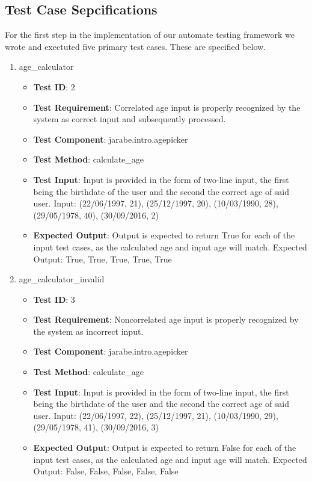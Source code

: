 \documentclass{article}
\begin{document}
\subsection{Test Case Sepcifications}
For the first step in the implementation of our automate testing framework we wrote and exectuted five primary test cases. These are specified below.
\begin{enumerate}[noitemsep]
\item age\_calculator
\begin{itemize}[noitemsep,topsep=0pt]
\item \textbf{Test ID}: 2
\item \textbf{Test Requirement}: Correlated age input is properly recognized by the system as correct input and subsequently processed.
\item \textbf{Test Component}: jarabe.intro.agepicker
\item \textbf{Test Method}: calculate\_age
\item \textbf{Test Input}: Input is provided in the form of two-line input, the first being the birthdate of the user and the second the correct age of said user. Input: (22/06/1997, 21), (25/12/1997, 20), (10/03/1990, 28), (29/05/1978, 40), (30/09/2016, 2)
\item \textbf{Expected Output}: Output is expected to return True for each of the input test cases, as the calculated age and input age will match. Expected Output: True, True, True, True, True
\end{itemize}
\item age\_calculator\_invalid
\begin{itemize}[noitemsep,topsep=0pt]
\item \textbf{Test ID}: 3
\item \textbf{Test Requirement}: Noncorrelated age input is properly recognized by the system as incorrect input.
\item \textbf{Test Component}: jarabe.intro.agepicker
\item \textbf{Test Method}: calculate\_age
\item \textbf{Test Input}: Input is provided in the form of two-line input, the first being the birthdate of the user and the second the correct age of said user. Input: (22/06/1997, 22), (25/12/1997, 21), (10/03/1990, 29), (29/05/1978, 41), (30/09/2016, 3)
\item \textbf{Expected Output}: Output is expected to return False for each of the input test cases, as the calculated age and input age will match. Expected Output: False, False, False, False, False

\end{itemize}
\end{enumerate}
\end{document}
